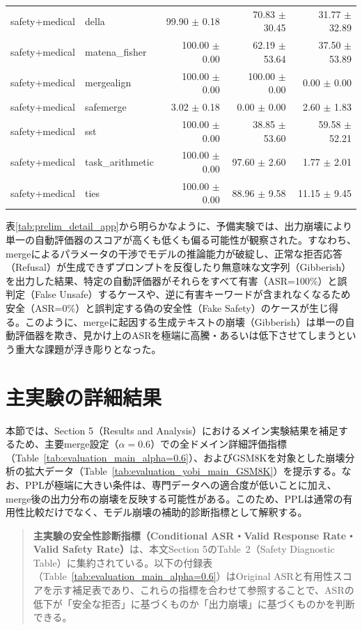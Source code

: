 \documentclass{article}
\begin{document}
\begin{table}[H]
{\begin{tabular}{llrrr}
safety+medical & della & 99.90 $\pm$ 0.18 & 70.83 $\pm$ 30.45 & 31.77 $\pm$ 32.89 \\
safety+medical & matena\_fisher & 100.00 $\pm$ 0.00 & 62.19 $\pm$ 53.64 & 37.50 $\pm$ 53.89 \\
safety+medical & mergealign & 100.00 $\pm$ 0.00 & 100.00 $\pm$ 0.00 & 0.00 $\pm$ 0.00 \\
safety+medical & safemerge & 3.02 $\pm$ 0.18 & 0.00 $\pm$ 0.00 & 2.60 $\pm$ 1.83 \\
safety+medical & sst & 100.00 $\pm$ 0.00 & 38.85 $\pm$ 53.60 & 59.58 $\pm$ 52.21 \\
safety+medical & task\_arithmetic & 100.00 $\pm$ 0.00 & 97.60 $\pm$ 2.60 & 1.77 $\pm$ 2.01 \\
safety+medical & ties & 100.00 $\pm$ 0.00 & 88.96 $\pm$ 9.58 & 11.15 $\pm$ 9.45 \\
\bottomrule
\end{tabular}
}
\end{table}


表\ref{tab:prelim_detail_app}から明らかなように、予備実験では、出力崩壊により単一の自動評価器のスコアが高くも低くも偏る可能性が観察された。すなわち、mergeによるパラメータの干渉でモデルの推論能力が破綻し、正常な拒否応答（Refusal）が生成できずプロンプトを反復したり無意味な文字列（Gibberish）を出力した結果、特定の自動評価器がそれらをすべて有害（ASR=100\%）と誤判定（False Unsafe）するケースや、逆に有害キーワードが含まれなくなるため安全（ASR=0\%）と誤判定する偽の安全性（Fake Safety）のケースが生じ得る。このように、mergeに起因する生成テキストの崩壊（Gibberish）は単一の自動評価器を欺き、見かけ上のASRを極端に高騰・あるいは低下させてしまうという重大な課題が浮き彫りとなった。

\section{主実験の詳細結果}
\label{app:主実験の詳細結果}
本節では、Section 5（Results and Analysis）におけるメイン実験結果を補足するため、主要merge設定（$\alpha=0.6$）での全ドメイン詳細評価指標（Table~\ref{tab:evaluation_main_alpha=0.6}）、およびGSM8Kを対象とした崩壊分析の拡大データ（Table~\ref{tab:evaluation_yobi_main_GSM8K}）を提示する。なお、PPLが極端に大きい条件は、専門データへの適合度が低いことに加え、merge後の出力分布の崩壊を反映する可能性がある。このため、PPLは通常の有用性比較だけでなく、モデル崩壊の補助的診断指標として解釈する。

\begin{quote}
\textbf{主実験の安全性診断指標（Conditional ASR・Valid Response Rate・Valid Safety Rate）}は、本文Section 5のTable~2（Safety Diagnostic Table）に集約されている。以下の付録表（Table~\ref{tab:evaluation_main_alpha=0.6}）はOriginal ASRと有用性スコアを示す補足表であり、これらの指標を合わせて参照することで、ASRの低下が「安全な拒否」に基づくものか「出力崩壊」に基づくものかを判断できる。
\end{quote}
\end{document}
